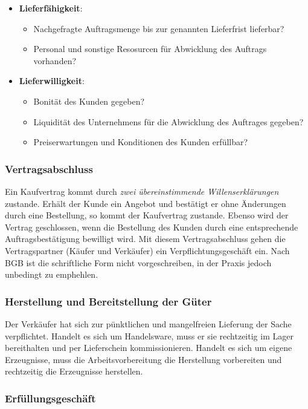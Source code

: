 \documentclass[a4paper, 12pt]{report}
\begin{document}
\begin{itemize}
    \item \textbf{Lieferfähigkeit}:
    \begin{itemize}
	\item Nachgefragte Auftragsmenge bis zur genannten Lieferfrist
	    lieferbar?
	\item Personal und sonstige Resosurcen für Abwicklung des Auftrags
	    vorhanden?
    \end{itemize}
    \item \textbf{Lieferwilligkeit}:
    \begin{itemize}
	\item Bonität des Kunden gegeben?
	\item Liquidität des Unternehmens für die Abwicklung des Auftrages
	    gegeben?
	\item Preiserwartungen und Konditionen des Kunden erfüllbar?
    \end{itemize}
\end{itemize}

\subsubsection{Vertragsabschluss}

Ein Kaufvertrag kommt durch \emph{zwei übereinstimmende Willenserklärungen}
zustande. Erhält der Kunde ein Angebot und bestätigt er ohne Änderungen durch
eine Bestellung, so kommt der Kaufvertrag zustande. Ebenso wird der Vertrag
geschlossen, wenn die Bestellung des Kunden durch eine entsprechende
Auftragsbestätigung bewilligt wird. Mit diesem Vertragsabschluss gehen die
Vertragspartner (Käufer und Verkäufer) ein Verpflichtungsgeschäft ein. Nach BGB
ist die schriftliche Form nicht vorgeschreiben, in der Praxis jedoch unbedingt
zu emphehlen.

\subsubsection{Herstellung und Bereitstellung der Güter}

Der Verkäufer hat sich zur pünktlichen und mangelfreien Lieferung der Sache
verpflichtet. Handelt es sich um Handelsware, muss er sie rechtzeitig im Lager
bereithalten und per Lieferschein kommissionieren. Handelt es sich um eigene
Erzeugnisse, muss die Arbeitsvorbereitung die Herstellung vorbereiten und
rechtzeitig die Erzeugnisse herstellen.

\subsubsection{Erfüllungsgeschäft}
\end{document}
